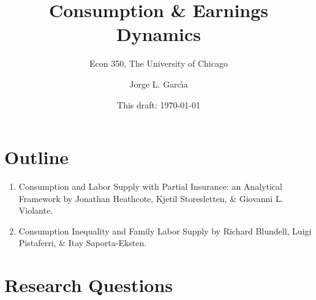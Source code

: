 \documentclass[notes=show]{beamer}
\begin{document}
\title[]{Consumption \& Earnings Dynamics}
\subtitle{Econ 350, The University of Chicago}
\author[]{Jorge L. Garc\'{\i}a}
\institute{}
\date{This draft: \today}
\maketitle

\section{Outline}

\begin{frame}%


\begin{enumerate}
\item Consumption and Labor Supply with Partial Insurance: an Analytical
Framework by Jonathan Heathcote, Kjetil Storesletten, \& Giovanni L.
Violante.

\item Consumption Inequality and Family Labor Supply by Richard Blundell,
Luigi Pistaferri, \& Itay Saporta-Eksten.
\end{enumerate}

\transboxout%
\end{frame}%

\bigskip

\section{Research Questions}
\end{document}
